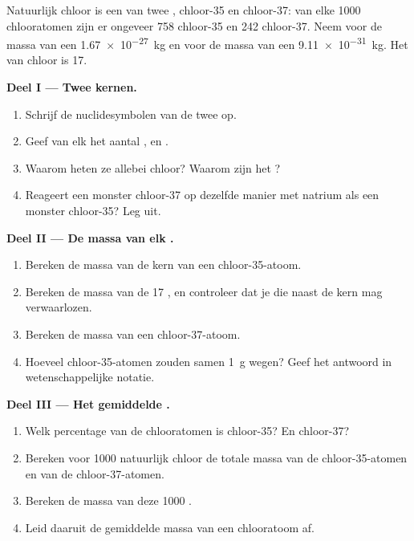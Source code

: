 \begin{problem}
\label{pb:g9:inside-the-atom:1}
Natuurlijk chloor is een  van twee , chloor-35 en
chloor-37: van elke 1000 chlooratomen zijn er ongeveer 758 chloor-35 en
242 chloor-37. Neem voor de massa van een  \qty{1.67e-27}{kg} en
voor de massa van een  \qty{9.11e-31}{kg}. Het  van
chloor is 17.

\medskip
\noindent\textbf{Deel I --- Twee kernen.}
\begin{enumerate}
  \item Schrijf de nuclidesymbolen van de twee  op.
  \item Geef van elk het aantal ,  en .
  \item Waarom heten ze allebei chloor? Waarom zijn het ?
  \item Reageert een monster chloor-37 op dezelfde manier met natrium als
        een monster chloor-35? Leg uit.
\end{enumerate}

\medskip
\noindent\textbf{Deel II --- De massa van elk .}
\begin{enumerate}[resume]
  \item Bereken de massa van de kern van een chloor-35-atoom.
  \item Bereken de massa van de 17 , en controleer dat je die
        naast de kern mag verwaarlozen.
  \item Bereken de massa van een chloor-37-atoom.
  \item Hoeveel chloor-35-atomen zouden samen \qty{1}{g} wegen? Geef het
        antwoord in wetenschappelijke notatie.
\end{enumerate}

\medskip
\noindent\textbf{Deel III --- Het gemiddelde .}
\begin{enumerate}[resume]
  \item Welk percentage van de chlooratomen is chloor-35? En chloor-37?
  \item Bereken voor 1000  natuurlijk chloor de totale massa van de
        chloor-35-atomen en van de chloor-37-atomen.
  \item Bereken de massa van deze 1000 .
  \item Leid daaruit de gemiddelde massa van een chlooratoom af.
\end{enumerate}
\end{problem}
